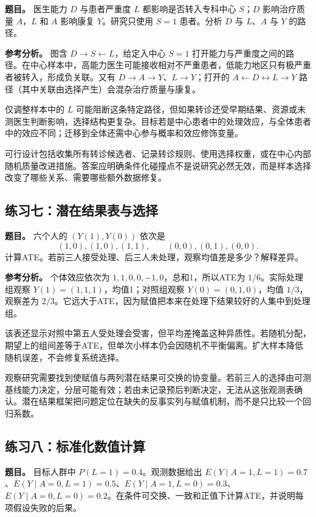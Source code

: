 \textbf{题目。} 医生能力 $D$ 与患者严重度 $L$ 都影响是否转入专科中心 $S$；$D$ 影响治疗质量 $A$，$L$ 和 $A$ 影响康复 $Y$。研究只使用 $S=1$ 患者。分析 $D$ 与 $L$、$A$ 与 $Y$ 的路径。

\textbf{参考分析。} 图含 $D\rightarrow S\leftarrow L$，给定入中心 $S=1$ 打开能力与严重度之间的路径。在中心样本中，高能力医生可能接收相对不严重患者，低能力地区只有极严重者被转入，形成负关联。又有 $D\rightarrow A\rightarrow Y$、$L\rightarrow Y$；打开的 $A\leftarrow D\leftrightarrow L\rightarrow Y$ 路径（其中关联由选择产生）会混杂治疗质量与康复。

仅调整样本中的 $L$ 可能阻断这条特定路径，但如果转诊还受早期结果、资源或未测医生判断影响，选择结构更复杂。目标若是中心患者中的处理效应，与全体患者中的效应不同；迁移到全体还需中心参与概率和效应修饰变量。

可行设计包括收集所有转诊候选者、记录转诊规则、使用选择权重，或在中心内部随机质量改进措施。答案应明确条件化碰撞点不是说研究必然无效，而是样本选择改变了哪些关系、需要哪些额外数据修复。

\subsection*{练习七：潜在结果表与选择}

\textbf{题目。} 六个人的 $(Y(1),Y(0))$ 依次是
\[
(1,0),(1,0),(1,1),\qquad (0,0),(0,1),(0,0).
\]
计算ATE。若前三人接受处理、后三人未处理，观察均值差是多少？解释差异。

\textbf{参考分析。} 个体效应依次为 $1,1,0,0,-1,0$，总和1，所以ATE为 $1/6$。实际处理组观察 $Y(1)=(1,1,1)$，均值1；对照组观察 $Y(0)=(0,1,0)$，均值 $1/3$，观察差为 $2/3$。它远大于ATE，因为赋值把本来在处理下结果较好的人集中到处理组。

该表还显示对照中第五人受处理会受害，但平均差掩盖这种异质性。若随机分配，期望上的组间差等于ATE，但单次小样本仍会因随机不平衡偏离。扩大样本降低随机误差，不会修复系统选择。

观察研究需要找到使赋值与两列潜在结果可交换的协变量。若前三人的选择由可测基线能力决定，分层可能有效；若由未记录预后判断决定，无法从这张观测表确认。潜在结果框架把问题定位在缺失的反事实列与赋值机制，而不是只比较一个回归系数。

\subsection*{练习八：标准化数值计算}

\textbf{题目。} 目标人群中 $P(L=1)=0.4$。观测数据给出 $E(Y\mid A=1,L=1)=0.7$、$E(Y\mid A=0,L=1)=0.5$、$E(Y\mid A=1,L=0)=0.3$、$E(Y\mid A=0,L=0)=0.2$。在条件可交换、一致和正值下计算ATE，并说明每项假设失败的后果。

